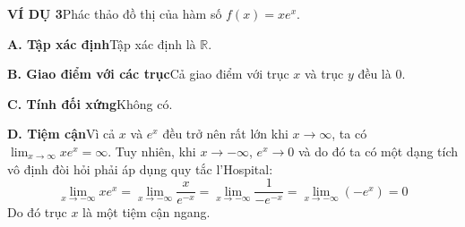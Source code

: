 \documentclass[10pt,a4paper]{article}
\begin{document}
\begin{minipage}[t]{0.71\textwidth}
    \vspace{0.8em}
    \noindent\textbf{\textsf{\color{stewartcyan}VÍ DỤ 3}}\quad Phác thảo đồ thị của hàm số $f(x) = xe^x$.

    \textbf{A. Tập xác định}\quad Tập xác định là $\mathbb{R}$.

    \textbf{B. Giao điểm với các trục}\quad Cả giao điểm với trục $x$ và trục $y$ đều là $0$.

    \textbf{C. Tính đối xứng}\quad Không có.

    \textbf{D. Tiệm cận}\quad Vì cả $x$ và $e^x$ đều trở nên rất lớn khi $x \to \infty$, ta có $\lim_{x \to \infty} xe^x = \infty$. Tuy nhiên, khi $x \to -\infty$, $e^x \to 0$ và do đó ta có một dạng tích vô định đòi hỏi phải áp dụng quy tắc l'Hospital:
    \[
    \lim_{x \to -\infty} xe^x = \lim_{x \to -\infty} \frac{x}{e^{-x}} = \lim_{x \to -\infty} \frac{1}{-e^{-x}} = \lim_{x \to -\infty} (-e^x) = 0
    \]
    Do đó trục $x$ là một tiệm cận ngang.
\end{minipage}
\end{document}
